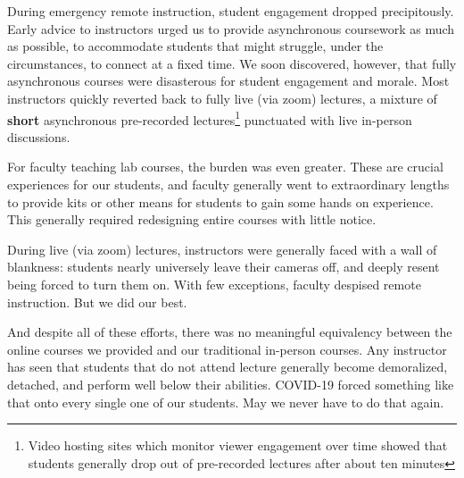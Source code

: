 \documentclass[12pt]{article}
\begin{document}
During emergency remote instruction, student engagement dropped
precipitously.  Early advice to instructors urged us to provide
asynchronous coursework as much as possible, to accommodate students
that might struggle, under the circumstances, to connect at a fixed
time.  We soon discovered, however, that fully asynchronous courses
were disasterous for student engagement and morale.  Most instructors
quickly reverted back to fully live (via zoom) lectures, a mixture of
{\bf short} asynchronous pre-recorded lectures\footnote{Video hosting
  sites which monitor viewer engagement over time showed that students
  generally drop out of pre-recorded lectures after about ten minutes}
punctuated with live in-person discussions.

For faculty teaching lab courses, the burden was even greater.  These
are crucial experiences for our students, and faculty generally went
to extraordinary lengths to provide kits or other means for students
to gain some hands on experience.  This generally required redesigning
entire courses with little notice.

During live (via zoom) lectures, instructors were generally faced with
a wall of blankness: students nearly universely leave their cameras
off, and deeply resent being forced to turn them on.  With few
exceptions, faculty despised remote instruction.  But we did our best.

And despite all of these efforts, there was no meaningful equivalency
between the online courses we provided and our traditional in-person
courses.  Any instructor has seen that students that do not attend
lecture generally become demoralized, detached, and perform well below
their abilities.  COVID-19 forced something like that onto every single
one of our students.  May we never have to do that again.
\end{document}
